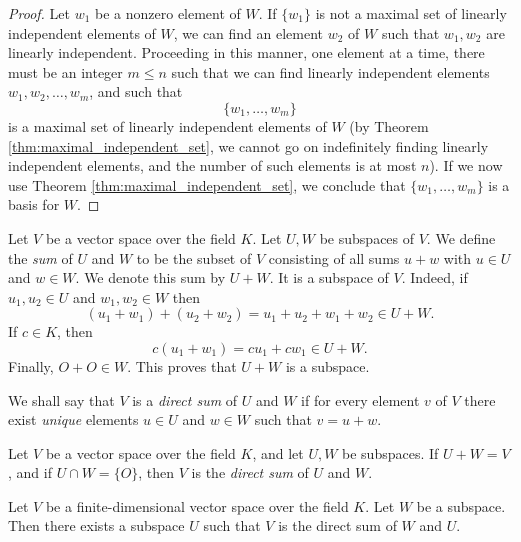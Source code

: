 \documentclass[../main.tex]{subfiles}
\begin{document}
        \begin{proof}
        Let \( w_1 \) be a nonzero element of \( W \). If \( \{ w_1 \} \) is not a maximal set of linearly independent elements of \( W \), we can find an element \( w_2 \) of \( W \) such that \( w_1, w_2 \) are linearly independent. Proceeding in this manner, one element at a time, there must be an integer \( m \leq n \) such that we can find linearly independent elements \( w_1, w_2, \dots, w_m \), and such that
        \[
        \{ w_1, \dots, w_m \}
        \]
        is a maximal set of linearly independent elements of \( W \) (by Theorem \ref{thm:maximal_independent_set}, we cannot go on indefinitely finding linearly independent elements, and the number of such elements is at most \( n \)). If we now use Theorem \ref{thm:maximal_independent_set}, we conclude that \( \{ w_1, \dots, w_m \} \) is a basis for \( W \).
        \end{proof}
        
        \begin{definition} \label{def:sum_subspaces}
        Let \( V \) be a vector space over the field \( K \). Let \( U, W \) be subspaces of \( V \). We define the \textit{sum} of \( U \) and \( W \) to be the subset of \( V \) consisting of all sums \( u + w \) with \( u \in U \) and \( w \in W \). We denote this sum by \( U + W \). It is a subspace of \( V \). Indeed, if \( u_1, u_2 \in U \) and \( w_1, w_2 \in W \) then
        \[
        (u_1 + w_1) + (u_2 + w_2) = u_1 + u_2 + w_1 + w_2 \in U + W.
        \]
        If \( c \in K \), then
        \[
        c (u_1 + w_1) = c u_1 + c w_1 \in U + W.
        \]
        Finally, \( O + O \in W \). This proves that \( U + W \) is a subspace.
        
        We shall say that \( V \) is a \textit{direct sum} of \( U \) and \( W \) if for every element \( v \) of \( V \) there exist \textit{unique} elements \( u \in U \) and \( w \in W \) such that \( v = u + w \).
        \end{definition}
        
        \begin{theorem} \label{thm:direct_sum_condition}
        Let \( V \) be a vector space over the field \( K \), and let \( U, W \) be subspaces. If \( U + W = V \), and if \( U \cap W = \{ O \} \), then \( V \) is the \textit{direct sum} of \( U \) and \( W \).
        \end{theorem}
        
        \begin{theorem} \label{thm:direct_sum_existence}
        Let \( V \) be a finite-dimensional vector space over the field \( K \). Let \( W \) be a subspace. Then there exists a subspace \( U \) such that \( V \) is the direct sum of \( W \) and \( U \).
        \end{theorem}
        
\end{document}
